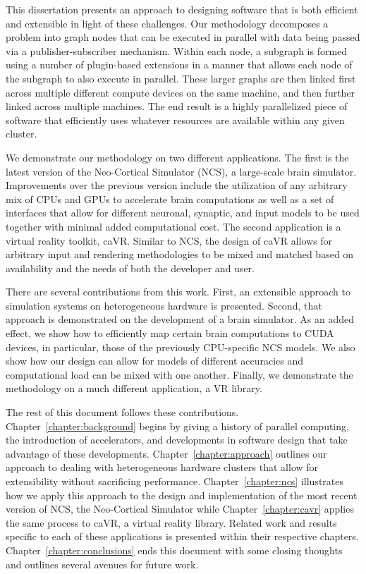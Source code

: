 This dissertation presents an approach to designing software that is both
efficient and extensible in light of these challenges. Our methodology
decomposes a problem into graph nodes that can be executed in parallel
with data being passed via a publisher-subscriber mechanism. Within each
node, a subgraph is formed using a number of plugin-based extensions
in a manner that allows each node of the subgraph to also execute in
parallel. These larger graphs are then linked first across multiple
different compute devices on the same machine, and then further linked
across multiple machines. The end result is a highly parallelized piece of
software that efficiently uses whatever resources are available within
any given cluster.

We demonstrate our methodology on two different applications. The first
is the latest version of the Neo-Cortical Simulator (NCS), a large-scale
brain simulator. Improvements over the previous version include the
utilization of any arbitrary mix of CPUs and GPUs to accelerate brain
computations as well as a set of interfaces that allow for different
neuronal, synaptic, and input models to be used together with minimal
added computational cost.  The second application is a virtual reality
toolkit, caVR. Similar to NCS, the design of caVR allows for arbitrary
input and rendering methodologies to be mixed and matched based on
availability and the needs of both the developer and user.

There are several contributions from this work. First, an extensible
approach to simulation systems on heterogeneous hardware is
presented. Second, that approach is demonstrated on the development
of a brain simulator. As an added effect, we show how to efficiently
map certain brain computations to CUDA devices, in particular, those of
the previously CPU-specific NCS models. We also show how our design can
allow for models of different accuracies and computational load can be
mixed with one another. Finally, we demonstrate the methodology on a
much different application, a VR library.

The rest of this document follows these contributions.
Chapter~\ref{chapter:background} begins by giving a history of parallel
computing, the introduction of accelerators, and developments
in software design that take advantage of these developments.
Chapter~\ref{chapter:approach} outlines our approach to dealing with
heterogeneous hardware clusters that allow for extensibility without
sacrificing performance. Chapter~\ref{chapter:ncs} illustrates
how we apply this approach to the design and implementation of
the most recent version of NCS, the Neo-Cortical Simulator while
Chapter~\ref{chapter:cavr} applies the same process to caVR,
a virtual reality library. Related work and results specific to
each of these applications is presented within their respective
chapters. Chapter~\ref{chapter:conclusions} ends this document with some
closing thoughts and outlines several avenues for future work.

